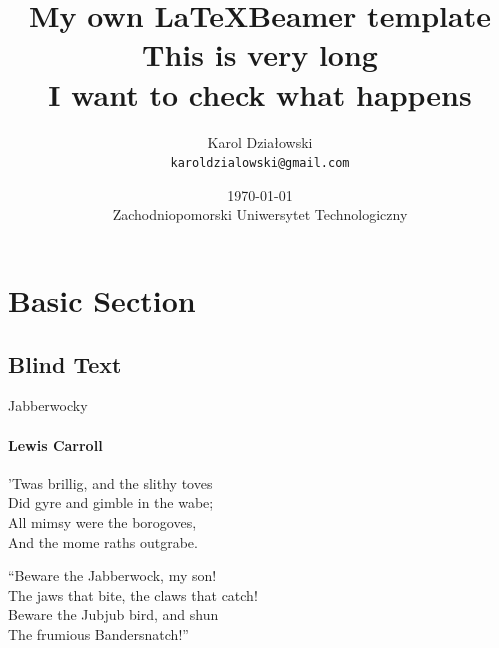 \documentclass{beamer}
\title{My own \LaTeX Beamer template \\ This is very long \\ I want to check what happens}
\date[\today]{\today \\ Zachodniopomorski Uniwersytet Technologiczny}
\author[Działowski]{Karol Działowski \\ \texttt{karoldzialowski@gmail.com}}
\begin{document}
\begin{frame}
\titlepage
\end{frame}

\section{Basic Section}
\subsection{Blind Text}
\begin{frame}{Jabberwocky}
    \framesubtitle{Lewis Carroll}%
    'Twas brillig, and the slithy toves\\
    Did gyre and gimble in the wabe;\\
    All mimsy were the borogoves,\\
    And the mome raths outgrabe.\\\bigskip

    “Beware the Jabberwock, my son!\\
    The jaws that bite, the claws that catch!\\
    Beware the Jubjub bird, and shun\\
    The frumious Bandersnatch!”\\
\end{frame}
\end{document}
